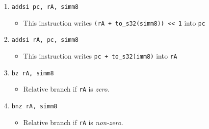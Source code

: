 \documentclass{article}
\begin{document}
\begin{itemize}
\begin{enumerate}
			\item \texttt{addsi pc, rA, simm8}
				\begin{itemize}
				\item This instruction writes
					\texttt{(rA + to\_s32(simm8)) << 1} into \texttt{pc}
				\end{itemize}
			\item \texttt{addsi rA, pc, simm8}
				\begin{itemize}
				\item This instruction writes \texttt{pc + to\_s32(imm8)}
					into \texttt{rA}
				\end{itemize}

			\item \texttt{bz rA, simm8}
				\begin{itemize}
				\item Relative branch if \texttt{rA} is \textit{zero}.
				\end{itemize}
			\item \texttt{bnz rA, simm8}
				\begin{itemize}
				\item Relative branch if \texttt{rA} is \textit{non-zero}.
				\end{itemize}
			\end{enumerate}
		\end{itemize}
\end{document}
